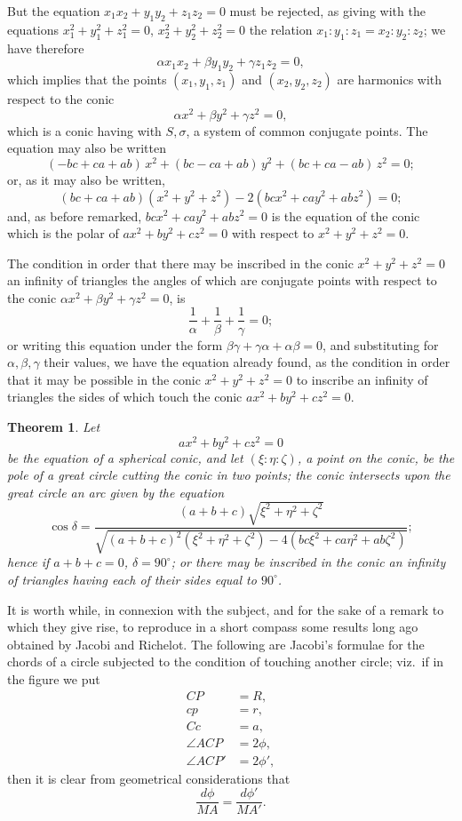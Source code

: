 \documentclass[12pt,a4paper]{article}
\theoremstyle{plain}
\newtheorem*{theorem*}{Theorem}
\begin{document}
But the equation $x_1x_2+y_1y_2+z_1z_2=0$ must be rejected, as giving with the equations $x_1^2+y_1^2+z_1^2=0$, $x_2^2+y_2^2+z_2^2=0$ the relation $x_1:y_1:z_1=x_2:y_2:z_2$; we have therefore
\[
\alpha x_1x_2+\beta y_1y_2+\gamma z_1z_2=0,
\]
which implies that the points $(x_1,y_1,z_1)$ and $(x_2,y_2,z_2)$ are harmonics with respect to the conic
\[
\alpha x^2+\beta y^2+\gamma z^2=0,
\]
which is a conic having with $S,\sigma$, a system of common conjugate points. The equation may also be written
\[
(-bc+ca+ab)\,x^2+(bc-ca+ab)\,y^2+(bc+ca-ab)\,z^2=0;
\]
or, as it may also be written,
\[
(bc+ca+ab)(x^2+y^2+z^2)-2(bcx^2+cay^2+abz^2)=0;
\]
and, as before remarked, $bcx^2+cay^2+abz^2=0$ is the equation of the conic which is the polar of $ax^2+by^2+cz^2=0$ with respect to $x^2+y^2+z^2=0$.

\medskip

The condition in order that there may be inscribed in the conic $x^2+y^2+z^2=0$ an infinity of triangles the angles of which are conjugate points with respect to the conic $\alpha x^2+\beta y^2+\gamma z^2=0$, is
\[
\frac{1}{\alpha}+\frac{1}{\beta}+\frac{1}{\gamma}=0;
\]
or writing this equation under the form $\beta\gamma+\gamma\alpha+\alpha\beta=0$, and substituting for $\alpha,\beta,\gamma$ their values, we have the equation already found, as the condition in order that it may be possible in the conic $x^2+y^2+z^2=0$ to inscribe an infinity of triangles the sides of which touch the conic $ax^2+by^2+cz^2=0$.

\begin{theorem*}
Let
\[
ax^2+by^2+cz^2=0
\]
be the equation of a spherical conic, and let $(\xi:\eta:\zeta)$, a point on the conic, be the pole of a great circle cutting the conic in two points; the conic intersects upon the great circle an arc given by the equation
\[
\cos\delta=\frac{(a+b+c)\sqrt{\xi^2+\eta^2+\zeta^2}}{\sqrt{(a+b+c)^2(\xi^2+\eta^2+\zeta^2)-4(bc\xi^2+ca\eta^2+ab\zeta^2)}};
\]
hence if $a+b+c=0$, $\delta=90^\circ$; or there may be inscribed in the conic an infinity of triangles having each of their sides equal to $90^\circ$.
\end{theorem*}

\medskip

It is worth while, in connexion with the subject, and for the sake of a remark to which they give rise, to reproduce in a short compass some results long ago obtained by Jacobi and Richelot. The following are Jacobi's formulae for the chords of a circle subjected to the condition of touching another circle; viz.\ if in the figure we put
\begin{align*}
CP&=R,\\
cp&=r,\\
Cc&=a,\\
\angle ACP&=2\phi,\\
\angle ACP'&=2\phi',
\end{align*}
then it is clear from geometrical considerations that
\[
\frac{d\phi}{MA}=\frac{d\phi'}{MA'}.
\]
\end{document}
